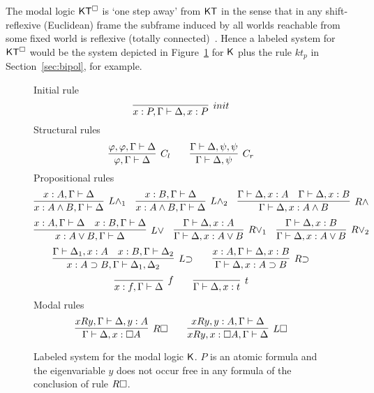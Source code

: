 
The modal logic $\mathsf{K}\mathsf{T}^\Box$ is `one step away' from  $\mathsf{K}\mathsf{T}$ in the sense that in any shift-reflexive (Euclidean) frame the subframe induced by all worlds reachable from some fixed world is reflexive (totally connected)~\cite{DBLP:conf/tableaux/Lang23}. Hence a labeled system for $\mathsf{K}\mathsf{T}^\Box$ would be the system depicted in Figure~\ref{fig:labk} for $\mathsf{K}$ plus the rule $kt_p$ in Section~\ref{sec:bipol}, for example.

\begin{figure}[t]%
{\sc Initial rule}
\[
  \infer[\init]{{x:P,\Gamma}\vdash{\Delta, x:P}}{}
\]
{\sc Structural rules}	
\[
  \infer[C_l]{\varphi, \Gamma \vdash \Delta}{\varphi, \varphi, \Gamma \vdash \Delta}
  \qquad
  \infer[C_r]{\Gamma \vdash \Delta, \psi}{\Gamma \vdash \Delta, \psi, \psi}
\]
{\sc Propositional rules}
\[
  \infer[\lwedge_1]{x:A\wedge B, \Gamma \vdash \Delta}{x:A, \Gamma \vdash \Delta}
  \quad
    \infer[\lwedge_2]{x:A\wedge B, \Gamma \vdash \Delta}{x:B, \Gamma \vdash \Delta}
 \quad
  \infer[\rwedge]{\Gamma \vdash \Delta, x:A \wedge B}{\Gamma \vdash \Delta, x:A & \Gamma \vdash \Delta, x:B}	
\]
\[
  \infer[\lvee]{x:A\vee B, \Gamma \vdash \Delta}{x:A,\Gamma \vdash \Delta & x:B,\Gamma \vdash \Delta}
  \quad
  \infer[\rvee_1]{\Gamma \vdash \Delta, x:A \vee B}{\Gamma \vdash \Delta, x:A}
  \quad
  \infer[\rvee_2]{\Gamma \vdash \Delta, x:A \vee B}{\Gamma \vdash \Delta, x:B}
\]
\[
  \infer[\limpl]{x:A\impl B, \Gamma \vdash \Delta_1,\Delta_2}{\Gamma \vdash \Delta_1, x:A & x:B,\Gamma \vdash \Delta_2}
  \qquad
  \infer[\rimpl]{\Gamma \vdash \Delta, x:A \impl B}{x:A, \Gamma \vdash \Delta, x:B}
\]
\[
  \infer[f]{x:f, \Gamma \vdash \Delta}{}
  \qquad
  \infer[t]{\Gamma \vdash \Delta,x:t}{}
\]
{\sc Modal rules}
\[
  \infer[\rbox]{\Gamma \vdash \Delta, x:\square A}{x \rel y, \Gamma \vdash \Delta, y:A} \qquad
  \infer[\lbox]{x \rel y,x:\Box A, \Gamma \vdash \Delta}{x \rel y, y:A,\Gamma \vdash \Delta}
\]
\caption{Labeled system for the modal logic $\mathsf{K}$. $P$ is an atomic formula
  and the eigenvariable $y$ does not occur free in any formula of the
  conclusion of rule $R\square$.}
\label{fig:labk}
\end{figure}	

